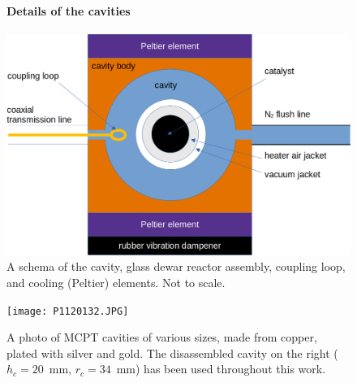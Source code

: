 \documentclass[12pt]{article}
\begin{document}
\clearpage

\begin{figure}[p]
\paragraph{Details of the cavities \vspace{1em}}
\begin{center}
\includegraphics[width=0.8\linewidth]{cavity_overview.png}
\caption{A schema of the cavity, glass dewar reactor assembly, coupling loop, and cooling (Peltier) elements. Not to scale. \label{cavity}}
\end{center}
\end{figure}

\begin{figure}[p]
\centering
\texttt{[image: P1120132.JPG]}
\caption{A photo of MCPT cavities of various sizes, made from copper, plated with silver and gold. The disassembled cavity on the right ($h_c = 20$~mm, $r_c = 34$~mm) has been used throughout this work.}
\end{figure}
\end{document}
